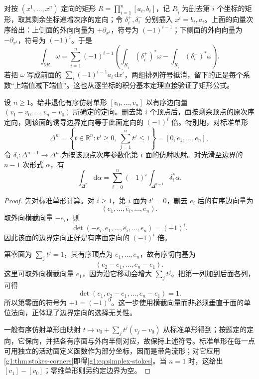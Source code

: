 对按 \((x^1,\ldots,x^n)\) 定向的矩形 \(R=\prod_{i=1}^n[a_i,b_i]\)，记 \(R_{\widehat i}\) 为删去第 \(i\) 个坐标的矩形，取其剩余坐标递增次序的定向；令 \(\delta_i^+,\delta_i^-\) 分别插入 \(x^i=b_i,a_i\)。上面的向量次序给出：上侧面的外向向量为 \(+\partial_{x^i}\)，符号为 \((-1)^{i-1}\)；下侧面的外向向量为 \(-\partial_{x^i}\)，符号为 \((-1)^i\)。于是
\begin{equation}\label{g1:eq:rectangle-boundary-signs}
	\int_{\partial R}\omega
	=\sum_{i=1}^n(-1)^{i-1}\left(
		\int_{R_{\widehat i}}(\delta_i^+)^*\omega
		-\int_{R_{\widehat i}}(\delta_i^-)^*\omega
	\right).
\end{equation}
若把 \(\omega\) 写成前面的 \(\sum_i(-1)^{i-1}a_i\,\mathrm{d}x^{\widehat i}\)，两组排列符号抵消，留下的正是每个系数“上端值减下端值”。这也从逐坐标的积分基本定理直接验证了矩形公式。

\begin{lemma}\label{g1:lem:simplex-boundary-orientation}
	设 \(n\ge1\)。给非退化有序仿射单形 \([v_0,\ldots,v_n]\) 以有序边向量 \((v_1-v_0,\ldots,v_n-v_0)\) 所确定的定向。删去第 \(i\) 个顶点后，面按剩余顶点的原次序定向，则该面的诱导边界定向等于此面定向的 \((-1)^i\) 倍。特别地，对标准单形
	\[
		\Delta^n=\left\{t\in\mathbb R^n:t^j\ge0,\ \sum_{j=1}^nt^j\le1\right\}
		=[0,e_1,\ldots,e_n],
	\]
	令 \(\delta_i:\Delta^{n-1}\to\Delta^n\) 为按该顶点次序参数化第 \(i\) 面的仿射映射。对光滑至边界的 \(n-1\) 次形式 \(\alpha\)，有
	\begin{equation}\label{g1:eq:simplex-stokes}
		\int_{\Delta^n}\mathrm{d}\alpha
		=\sum_{i=0}^n(-1)^i\int_{\Delta^{n-1}}\delta_i^*\alpha.
	\end{equation}
\end{lemma}
\begin{proof}
	先对标准单形计算。对 \(i\ge1\)，第 \(i\) 面为 \(t^i=0\)，删去 \(e_i\) 后的有序边向量为
	\[
		(e_1,\ldots,\widehat e_i,\ldots,e_n).
	\]
	取外向横截向量 \(-e_i\)，则
	\[
		\det(-e_i,e_1,\ldots,\widehat e_i,\ldots,e_n)=(-1)^i.
	\]
	因此该面的边界定向正好是有序面定向的 \((-1)^i\) 倍。

	第零面为 \(\sum_jt^j=1\)，其有序顶点为 \(e_1,\ldots,e_n\)，故有序切向基为
	\[
		(e_2-e_1,\ldots,e_n-e_1).
	\]
	这里可取外向横截向量 \(e_1\)，因为沿它移动会增大 \(\sum_jt^j\)。把第一列加到后面各列，可得
	\[
		\det(e_1,e_2-e_1,\ldots,e_n-e_1)=1.
	\]
	所以第零面的符号为 \(+1=(-1)^0\)。这一步使用横截向量而非必须垂直于面的单位法向，正体现了边界定向的选择无关性。

	一般有序仿射单形由映射 \(t\mapsto v_0+\sum_jt^j(v_j-v_0)\) 从标准单形得到；按题定的定向，它保向，并把各有序面与外向半侧对应，故保持上述符号。标准单形在每一点可用独立的活动面定义函数作为部分坐标，因而是带角流形；对它应用\cref{g1:thm:stokes-corners}即得\eqref{g1:eq:simplex-stokes}。当 \(n=1\) 时，这给出 \([v_1]-[v_0]\)；零维单形则另约定边界为空。
\end{proof}

